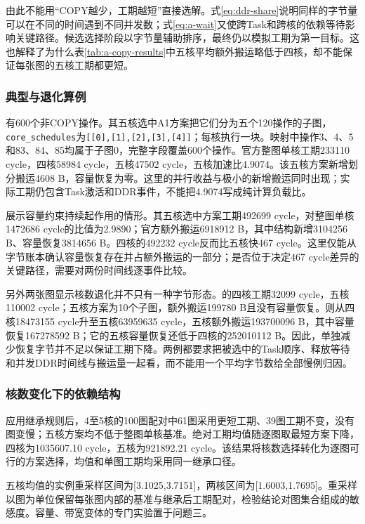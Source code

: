 由此不能用“COPY越少，工期越短”直接选解。式\eqref{eq:ddr-share}说明同样的字节量可以在不同的时间遇到不同并发数；式\eqref{eq:a-wait}又使跨Task和跨核的依赖等待影响关键路径。候选选择阶段以字节量辅助排序，最终仍以模拟工期为第一目标。这也解释了为什么表\ref{tab:a-copy-results}中五核平均额外搬运略低于四核，却不能保证每张图的五核工期都更短。

\subsubsection{典型与退化算例}
有600个非COPY操作。其五核选中A1方案把它们分为五个120操作的子图，\texttt{core\_schedules}为\texttt{[[0],[1],[2],[3],[4]]}；每核执行一块。映射中操作3、4、5和83、84、85均属于子图0，完整字段覆盖600个操作。官方整图单核工期233110 cycle，四核58984 cycle，五核47502 cycle，五核加速比4.9074。该五核方案新增划分搬运4608 B，容量恢复为零。这里的并行收益与极小的新增搬运同时出现；实际工期仍包含Task激活和DDR事件，不能把4.9074写成纯计算负载比。

展示容量约束持续起作用的情形。其五核选中方案工期492699 cycle，对整图单核1472686 cycle的比值为2.9890；官方额外搬运6918912 B，其中结构新增3104256 B、容量恢复3814656 B。四核的492232 cycle反而比五核快467 cycle。这里仅能从字节账本确认容量恢复存在并占额外搬运的一部分；是否位于决定467 cycle差异的关键路径，需要对两份时间线逐事件比较。

另外两张图显示核数退化并不只有一种字节形态。的四核工期32099 cycle，五核110002 cycle；五核方案为10个子图，额外搬运199780 B且没有容量恢复。则从四核18473155 cycle升至五核63959635 cycle，五核额外搬运193700096 B，其中容量恢复167278592 B；它的五核容量恢复还低于四核的252010112 B。因此，单独减少恢复字节并不足以保证工期下降。两例都要求把被选中的Task顺序、释放等待和并发DDR时间线与搬运量一起看，而不能用一个平均字节数给全部慢例归因。

\subsubsection{核数变化下的依赖结构}
应用继承规则后，4至5核的100图配对中61图采用更短工期、39图工期不变，没有图变慢；五核方案均不低于整图单核基准。绝对工期均值随逐图取最短方案下降，四核为1035607.10 cycle，五核为921892.21 cycle。该结果将核数选择转化为逐图可行的方案选择，均值和单图工期均采用同一继承口径。

五核均值的实例重采样区间为[3.1025,3.7151]，两核区间为[1.6003,1.7695]。重采样以图为单位保留每张图内部的基准与继承后工期配对，检验结论对图集合组成的敏感度。容量、带宽变体的专门实验置于问题三。


